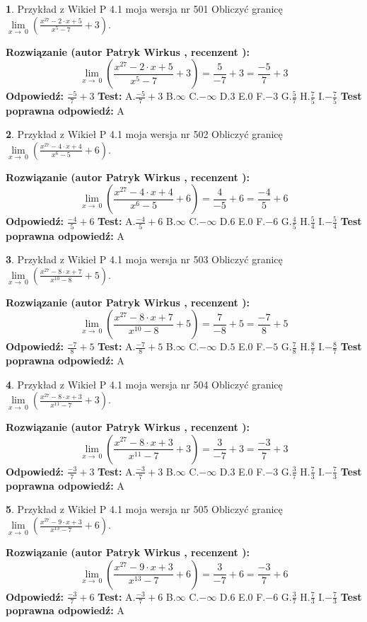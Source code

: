 \documentclass[12pt, a4paper]{article}
\theoremstyle{definition} %
\newtheorem{zad}{}
\newcommand{\zadStart}[1]{\begin{zad}#1\newline}
\newcommand{\zadStop}{\end{zad}}
\newcommand{\rozwStart}[2]{\noindent \textbf{Rozwiązanie (autor #1 , recenzent #2): }\newline}
\newcommand{\rozwStop}{\newline}
\newcommand{\odpStart}{\noindent \textbf{Odpowiedź:}\newline}
\newcommand{\odpStop}{\newline}
\newcommand{\testStart}{\noindent \textbf{Test:}\newline}
\newcommand{\testStop}{\newline}
\newcommand{\kluczStart}{\noindent \textbf{Test poprawna odpowiedź:}\newline}
\newcommand{\kluczStop}{\newline}
\begin{document}
\zadStart{Przykład z Wikieł P 4.1 moja wersja nr 501}
Obliczyć granicę $\lim\limits_{x\to\ 0}(\frac{x^{27}-2 \cdot x +5}{x^{5}-7}+3)$.
\zadStop
\rozwStart{Patryk Wirkus}{}
$$\lim\limits_{x\to\ 0}(\frac{x^{27}-2 \cdot x +5}{x^{5}-7}+3)=\frac{5}{-7}+3=\frac{-5}{7}+3$$
\rozwStop
\odpStart
$\frac{-5}{7}+3$
\odpStop
\testStart
A.$\frac{-5}{7}+3$
B.$\infty$
C.$-\infty$
D.$3$
E.$0$
F.$-3$
G.$\frac{5}{7}$
H.$\frac{7}{5}$
I.$-\frac{7}{5}$
\testStop
\kluczStart
A
\kluczStop



\zadStart{Przykład z Wikieł P 4.1 moja wersja nr 502}
Obliczyć granicę $\lim\limits_{x\to\ 0}(\frac{x^{27}-4 \cdot x +4}{x^{6}-5}+6)$.
\zadStop
\rozwStart{Patryk Wirkus}{}
$$\lim\limits_{x\to\ 0}(\frac{x^{27}-4 \cdot x +4}{x^{6}-5}+6)=\frac{4}{-5}+6=\frac{-4}{5}+6$$
\rozwStop
\odpStart
$\frac{-4}{5}+6$
\odpStop
\testStart
A.$\frac{-4}{5}+6$
B.$\infty$
C.$-\infty$
D.$6$
E.$0$
F.$-6$
G.$\frac{4}{5}$
H.$\frac{5}{4}$
I.$-\frac{5}{4}$
\testStop
\kluczStart
A
\kluczStop



\zadStart{Przykład z Wikieł P 4.1 moja wersja nr 503}
Obliczyć granicę $\lim\limits_{x\to\ 0}(\frac{x^{27}-8 \cdot x +7}{x^{10}-8}+5)$.
\zadStop
\rozwStart{Patryk Wirkus}{}
$$\lim\limits_{x\to\ 0}(\frac{x^{27}-8 \cdot x +7}{x^{10}-8}+5)=\frac{7}{-8}+5=\frac{-7}{8}+5$$
\rozwStop
\odpStart
$\frac{-7}{8}+5$
\odpStop
\testStart
A.$\frac{-7}{8}+5$
B.$\infty$
C.$-\infty$
D.$5$
E.$0$
F.$-5$
G.$\frac{7}{8}$
H.$\frac{8}{7}$
I.$-\frac{8}{7}$
\testStop
\kluczStart
A
\kluczStop



\zadStart{Przykład z Wikieł P 4.1 moja wersja nr 504}
Obliczyć granicę $\lim\limits_{x\to\ 0}(\frac{x^{27}-8 \cdot x +3}{x^{11}-7}+3)$.
\zadStop
\rozwStart{Patryk Wirkus}{}
$$\lim\limits_{x\to\ 0}(\frac{x^{27}-8 \cdot x +3}{x^{11}-7}+3)=\frac{3}{-7}+3=\frac{-3}{7}+3$$
\rozwStop
\odpStart
$\frac{-3}{7}+3$
\odpStop
\testStart
A.$\frac{-3}{7}+3$
B.$\infty$
C.$-\infty$
D.$3$
E.$0$
F.$-3$
G.$\frac{3}{7}$
H.$\frac{7}{3}$
I.$-\frac{7}{3}$
\testStop
\kluczStart
A
\kluczStop



\zadStart{Przykład z Wikieł P 4.1 moja wersja nr 505}
Obliczyć granicę $\lim\limits_{x\to\ 0}(\frac{x^{27}-9 \cdot x +3}{x^{13}-7}+6)$.
\zadStop
\rozwStart{Patryk Wirkus}{}
$$\lim\limits_{x\to\ 0}(\frac{x^{27}-9 \cdot x +3}{x^{13}-7}+6)=\frac{3}{-7}+6=\frac{-3}{7}+6$$
\rozwStop
\odpStart
$\frac{-3}{7}+6$
\odpStop
\testStart
A.$\frac{-3}{7}+6$
B.$\infty$
C.$-\infty$
D.$6$
E.$0$
F.$-6$
G.$\frac{3}{7}$
H.$\frac{7}{3}$
I.$-\frac{7}{3}$
\testStop
\kluczStart
A
\kluczStop
\end{document}
